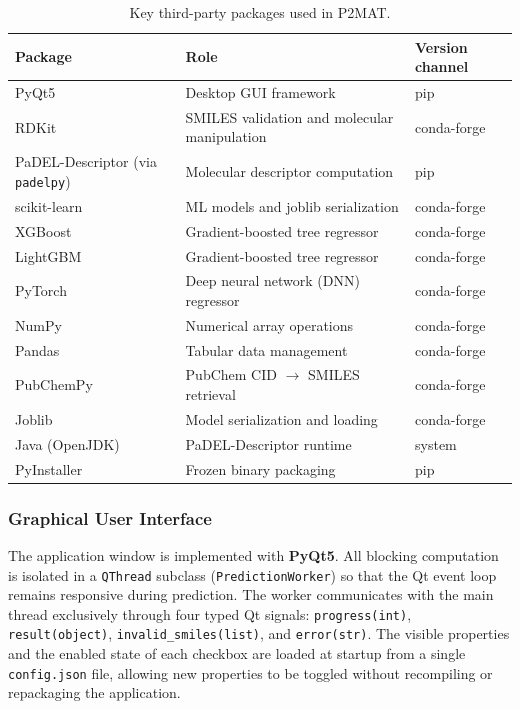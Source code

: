 \begin{table}[htbp]
\centering
\caption{Key third-party packages used in P2MAT.}
\label{tab:packages}
\begin{tabular}{lll}
\hline
\textbf{Package} & \textbf{Role} & \textbf{Version channel} \\
\hline
PyQt5           & Desktop GUI framework               & pip \\
RDKit           & SMILES validation and molecular manipulation & conda-forge \\
PaDEL-Descriptor (via \texttt{padelpy}) & Molecular descriptor computation & pip \\
scikit-learn    & ML models and joblib serialization  & conda-forge \\
XGBoost         & Gradient-boosted tree regressor     & conda-forge \\
LightGBM        & Gradient-boosted tree regressor     & conda-forge \\
PyTorch         & Deep neural network (DNN) regressor & conda-forge \\
NumPy           & Numerical array operations          & conda-forge \\
Pandas          & Tabular data management             & conda-forge \\
PubChemPy       & PubChem CID $\rightarrow$ SMILES retrieval & conda-forge \\
Joblib          & Model serialization and loading     & conda-forge \\
Java (OpenJDK)  & PaDEL-Descriptor runtime            & system \\
PyInstaller     & Frozen binary packaging             & pip \\
\hline
\end{tabular}
\end{table}

\subsubsection*{Graphical User Interface}
The application window is implemented with \textbf{PyQt5}.
All blocking computation is isolated in a \texttt{QThread} subclass
(\texttt{PredictionWorker}) so that the Qt event loop remains responsive during
prediction.
The worker communicates with the main thread exclusively through four typed Qt
signals: \texttt{progress(int)}, \texttt{result(object)},
\texttt{invalid\_smiles(list)}, and \texttt{error(str)}.
The visible properties and the enabled state of each checkbox are loaded at
startup from a single \texttt{config.json} file, allowing new properties to be
toggled without recompiling or repackaging the application.

